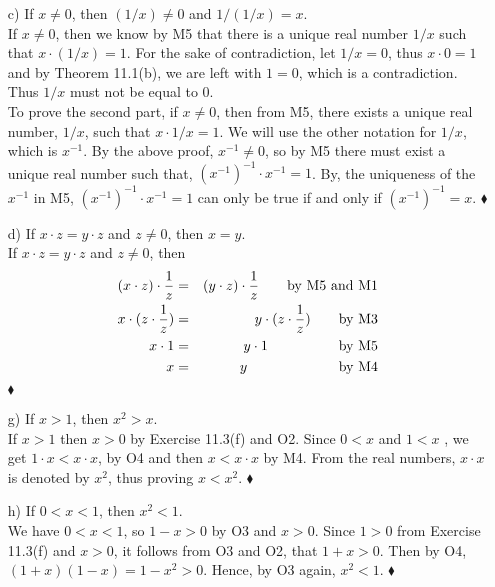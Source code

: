 \documentclass[12pt]{article}
\begin{document}
\begin{enumerate}
\begin{enumerate}
\item[c)] If $x \neq 0$, then $(1/x) \neq 0$ and $1/(1/x) = x$. \\
If $x \neq 0$, then we know by M5 that there is a unique real number $1/x$ such that
$x \cdot (1/x) = 1$. For the sake of contradiction, let $1/x = 0$, thus $x \cdot 0 = 1$ and by
Theorem 11.1(b), we are left with $1 = 0$, which is a contradiction. Thus $1/x$ must not be
equal to 0.
\[ \]
To prove the second part, if $x \neq 0$, then from M5, there exists a unique real number, $1/x$, such that
$x \cdot 1/x = 1$. We will use the other notation for $1/x$, which is $x^{-1}$. 
By the above proof, $x^{-1} \neq 0$, so by M5 there must
exist a unique real number such that, $(x^{-1})^{-1} \cdot x^{-1} = 1$. 
By, the uniqueness of the $x^{-1}$ in M5, $(x^{-1})^{-1} \cdot x^{-1} = 1$ can 
only be true if and only if $(x^{-1})^{-1} = x$. $\blacklozenge$

\item[d)] If $x \cdot z = y \cdot z$ and $z \neq 0$, then $x = y$. \\
If $x \cdot z = y \cdot z$ and $z \neq 0$, then 
\begin{eqnarray*}
(x \cdot z) \cdot \frac{1}{z} &=& (y \cdot z) \cdot \frac{1}{z} \qquad \mbox{by M5 and M1} \\
x \cdot (z \cdot \frac{1}{z}) &=& y \cdot (z \cdot \frac{1}{z}) \qquad \mbox{by M3} \\
x \cdot 1 &=& y \cdot 1 \hskip 1.78cm \mbox{by M5} \\
x &=& y \hskip 2.30cm \mbox{by M4}
\end{eqnarray*}$\blacklozenge$ 

\item[g)] If $x > 1$, then $x^2 > x$. \\
If $x > 1$ then $x > 0$ by Exercise 11.3(f) and O2. Since $0 < x$ and $1 < x$
, we get $1 \cdot x < x \cdot x$, by
O4 and then $x < x \cdot x$ by M4. From the real numbers, $x \cdot x$ is denoted by $x^2$, thus proving $x < x^2$.
$\blacklozenge$

\item[h)] If $0 < x < 1$, then $x^2 < 1$. \\
We have $0 < x < 1$, so $1 - x > 0$ by O3 and $x > 0$. Since $1 > 0$ from Exercise 11.3(f) and
$x > 0$, it follows from O3 and O2, that $1 + x > 0$. Then by O4, $(1 + x)(1 - x) = 1 - x^2 > 0$. 
Hence, by O3 again, $x^2 < 1$. $\blacklozenge$


\end{enumerate}
\end{enumerate}
\end{document}
